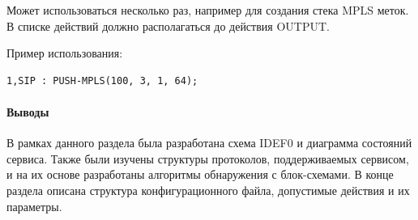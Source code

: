 Может использоваться несколько раз, например для создания стека MPLS меток. В списке действий должно располагаться до действия OUTPUT.

Пример использования:
\begin{lstlisting}
1,SIP : PUSH-MPLS(100, 3, 1, 64);
\end{lstlisting}

\paragraph{Выводы}

В рамках данного раздела была разработана схема IDEF0 и диаграмма состояний сервиса. Также были изучены структуры протоколов, поддерживаемых сервисом, и на их основе разработаны алгоритмы обнаружения с блок-схемами. В конце раздела описана структура конфигурационного файла, допустимые действия и их параметры.
